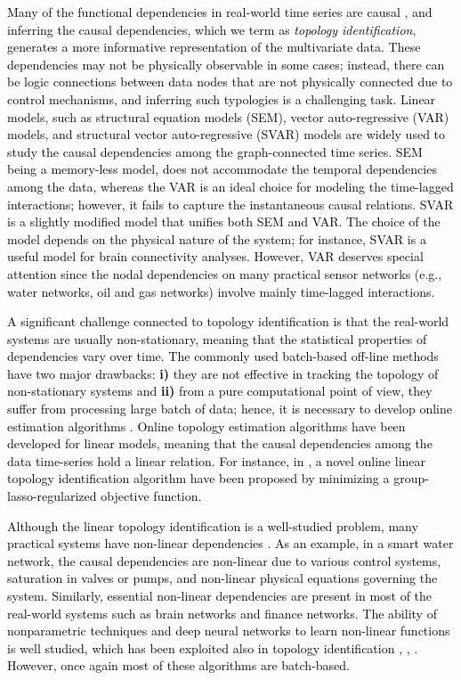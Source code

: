 \documentclass[conference]{IEEEtran}
\newcommand{\cB}[1]{\textcolor{black}{#1}}
\begin{document}
\cB{Many of the functional dependencies in real-world time series are causal \cite{equc.j2011}, and inferring the causal dependencies, which we term as \textit{topology identification}, generates a more informative representation of the multivariate  data. These dependencies may not be physically observable in some cases; instead, there can be logic connections between data nodes that are not physically connected due to control mechanisms, and inferring such typologies is a challenging task. Linear models, such as structural equation models (SEM), vector auto-regressive (VAR) models, and structural vector auto-regressive (SVAR) models \cite{topg.b2018} are widely used to study the causal dependencies among the graph-connected time series. SEM being a memory-less model, does not accommodate the temporal dependencies among the data, whereas the VAR is an ideal choice for modeling the time-lagged interactions; however, it fails to capture the instantaneous causal relations. SVAR is a slightly modified model that unifies both SEM and VAR. The choice of the model depends on the physical nature of the system; for instance, SVAR is a useful model for brain connectivity analyses. However, VAR deserves special attention since the nodal dependencies on many practical sensor networks (e.g., water networks, oil and gas networks)  involve mainly time-lagged interactions.}

\cB{A significant challenge connected to topology identification is that the real-world systems are usually non-stationary, meaning that the statistical properties of dependencies vary over time. The commonly used batch-based off-line methods \cite{nonshe2019} have two major drawbacks: \textbf{i)} they are not effective in tracking the topology of non-stationary systems and \textbf{ii)} from a pure computational point of view, they suffer from processing large batch of data; hence, it is necessary to develop online estimation algorithms \cite{onlzam2019}.  Online topology estimation algorithms have been developed for linear models, meaning that the causal dependencies among the data  time-series hold a linear relation. For instance, in  \cite{onlzam2019}, a novel online linear topology identification algorithm have been proposed by minimizing a group-lasso-regularized \cite{aspnoa2013} objective function.}

\cB{Although the linear topology identification is a well-studied problem, many practical systems have non-linear dependencies \cite{vecche2011}. As an example, in a smart water network, the causal dependencies are non-linear due to various control systems, saturation in valves or pumps, and non-linear physical equations  governing the system.  Similarly,  essential non-linear dependencies are present in most of the real-world systems such as brain networks and finance networks. The ability of nonparametric techniques \cite{unimic2006} and deep neural networks to learn  non-linear functions is well studied, which has been exploited also in topology identification  \cite{neuale2018}, \cite{nonshe2019}, \cite{kery.s2018}. However, once again most of these algorithms are batch-based.}
\end{document}
